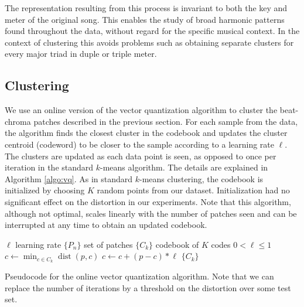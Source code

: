 \documentclass{article}
\DeclareMathOperator*{\dist}{dist}
\begin{document}
The representation resulting from this process is invariant to both
the key and meter of the original song.  This enables the study of
broad harmonic patterns found throughout the data, without regard for
the specific musical context.
%
In the context of clustering this avoids problems such as obtaining separate
clusters for every major triad in duple or triple meter.
%

\subsection{Clustering}

We use an online version of the vector quantization algorithm
\cite{Gersho1991} to cluster the beat-chroma patches described in the
previous section.
For each sample from the data, the algorithm finds the closest cluster
in the codebook and updates the cluster centroid (codeword) to be
closer to the sample according to a learning rate $\ell$.
The clusters are updated as each data point is seen, as opposed to
once per iteration in the standard $k$-means algorithm.
The details are explained in Algorithm \ref{algo:vq}.
%
As in standard $k$-means clustering, the codebook is initialized by
choosing $K$ random points from our dataset.
Initialization had no significant effect on the distortion
in our experiments.
%
Note that this algorithm, although not optimal, scales linearly with
the number of patches seen and can be interrupted at any time
to obtain an updated codebook. %

\begin{algorithm}
\begin{algorithmic}
\STATE$\ell$ learning rate
\STATE$\{P_n\}$ set of patches
\STATE$\{C_k\}$ codebook of $K$ codes
\REQUIRE $0 < \ell \leq 1$
\STATE$c \leftarrow \min_{c \in C_k} \dist(p,c)$
\STATE$c \leftarrow c + (p - c) * \ell$
\ENDFOR
\ENDFOR
\RETURN $\{C_k\}$
\caption{\small{Pseudocode for the online vector quantization
    algorithm. Note that we can replace the number of iterations by a
    threshold on the distortion over some test set.}
\label{algo:vq}}
\end{algorithmic}
\end{algorithm}
\end{document}
